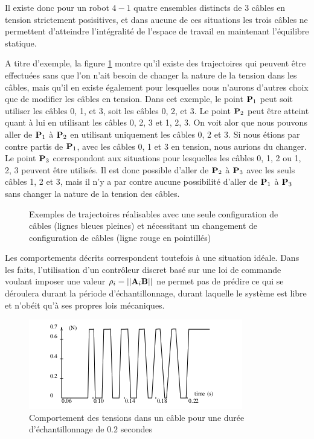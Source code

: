 Il existe donc pour un robot $4-1$ quatre ensembles distincts de 3 câbles en tension strictement posisitives, et dans aucune de ces situations les trois câbles ne permettent d'atteindre l'intégralité de l'espace de travail en maintenant l'équilibre statique.

A titre d'exemple, la figure \ref{chap01:fig000} montre qu'il existe des trajectoires qui peuvent être effectuées sans que l'on n'ait besoin de changer la nature de la tension dans les câbles, mais qu'il en existe également pour lesquelles nous n'aurons d'autres choix que de modifier les câbles en tension. Dans cet exemple, le point ${\bf P}_1$ peut soit utiliser les câbles 0, 1, et 3, soit les câbles 0, 2, et 3. Le point ${\bf P}_2$ peut être atteint quant à lui en utilisant les câbles 0, 2, 3 et 1, 2, 3. On voit alor que nous pouvons aller de ${\bf P}_1$ à ${\bf P}_2$ en utilisant uniquement les câbles 0, 2 et 3. Si nous étions par contre partis de ${\bf P}_1$, avec les câbles 0, 1 et 3 en tension, nous aurions du changer. Le point ${\bf P}_3$ correspondont aux situations pour lesquelles les câbles 0, 1, 2 ou 1, 2, 3 peuvent être utilisés. Il est donc possible d'aller de ${\bf P}_2$ à ${\bf P}_3$ avec les seuls câbles 1, 2 et 3, mais il n'y a par contre aucune possibilité d'aller de ${\bf P}_1$ à ${\bf P}_3$ sans changer la nature de la tension des câbles.


\begin{figure}[!ht]
  \centering
    \def\svgwidth{.65\linewidth}
  
    \caption{\footnotesize{Exemples de trajectoires réalisables avec une seule configuration de câbles (lignes bleues pleines) et nécessitant un changement de configuration de câbles (ligne rouge en pointillés)}}
\label{chap01:fig000}
\end{figure}

Les comportements décrits correspondent toutefois à une situation idéale. Dans les faits, l'utilisation d'un contrôleur discret basé sur une loi de commande voulant imposer une valeur $\rho_i = ||{\bf A}_i{\bf B}||$ ne permet pas de prédire ce qui se déroulera durant la période d'échantillonnage, durant laquelle le système est libre et n'obéit qu'à ses propres lois mécaniques.

\begin{figure}[!htp]
  \centering
    \includegraphics[width=.75\linewidth]{./chapter01/figures/controleur_discret.png}
    \caption{\footnotesize Comportement des tensions dans un câble pour une durée d'échantillonnage de $0.2$ secondes}
\label{chap01:fig00}
\end{figure}

